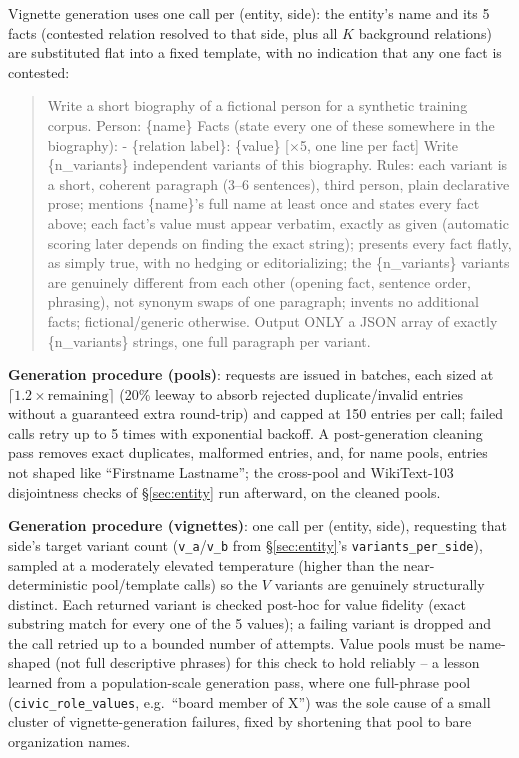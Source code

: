 \documentclass[11pt]{article}
\begin{document}
Vignette generation uses one call per (entity, side): the entity's name and
its 5 facts (contested relation resolved to that side, plus all $K$
background relations) are substituted flat into a fixed template, with no
indication that any one fact is contested:

\begin{quote}\small\ttfamily
Write a short biography of a fictional person for a synthetic training corpus.\newline
Person: \{name\}\newline
Facts (state every one of these somewhere in the biography):\newline
- \{relation label\}: \{value\} [$\times$5, one line per fact]\newline
Write \{n\_variants\} independent variants of this biography.\newline
Rules: each variant is a short, coherent paragraph (3--6 sentences), third person,
plain declarative prose; mentions \{name\}'s full name at least once and states every
fact above; each fact's value must appear verbatim, exactly as given (automatic
scoring later depends on finding the exact string); presents every fact flatly, as
simply true, with no hedging or editorializing; the \{n\_variants\} variants are
genuinely different from each other (opening fact, sentence order, phrasing), not
synonym swaps of one paragraph; invents no additional facts; fictional/generic
otherwise.\newline
Output ONLY a JSON array of exactly \{n\_variants\} strings, one full paragraph per
variant.
\end{quote}

\textbf{Generation procedure (pools)}: requests are issued in batches, each
sized at $\lceil 1.2 \times \text{remaining}\rceil$ (20\% leeway to absorb
rejected duplicate/invalid entries without a guaranteed extra round-trip) and
capped at 150 entries per call; failed calls retry up to 5 times with
exponential backoff. A post-generation cleaning pass removes exact
duplicates, malformed entries, and, for name pools, entries not shaped like
``Firstname Lastname''; the cross-pool and WikiText-103 disjointness checks of
\S\ref{sec:entity} run afterward, on the cleaned pools.

\textbf{Generation procedure (vignettes)}: one call per (entity, side),
requesting that side's target variant count
(\texttt{v\_a}/\texttt{v\_b} from \S\ref{sec:entity}'s
\texttt{variants\_per\_side}), sampled at a moderately elevated temperature
(higher than the near-deterministic pool/template calls) so the $V$ variants
are genuinely structurally distinct. Each returned variant is checked
post-hoc for value fidelity (exact substring match for every one of the 5
values); a failing variant is dropped and the call retried up to a bounded
number of attempts. Value pools must be name-shaped (not full descriptive
phrases) for this check to hold reliably -- a lesson learned from a
population-scale generation pass, where one full-phrase pool
(\texttt{civic\_role\_values}, e.g.\ ``board member of X'') was the sole
cause of a small cluster of vignette-generation failures, fixed by shortening
that pool to bare organization names.
\end{document}
